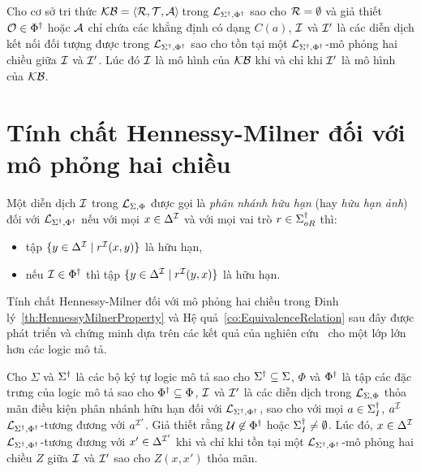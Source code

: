 \begin{Corollary}
\label{co:KnowledgeBaseInvariant}
	Cho cơ sở tri thức $\mathcal{KB} = \left\langle\mathcal{R}, \mathcal{T}, \mathcal{A}\right\rangle\!$ trong $\mathcal{L}_{\Sigma^\dag,\Phi^\dag}$ sao cho $\mathcal{R} = \emptyset$ và giả thiết $\mathcal{O} \in \Phi^\dag$ hoặc $\mathcal{A}$ chỉ chứa các khẳng định có dạng $C(a)$, $\mathcal{I}$ và $\mathcal{I}'$ là các diễn dịch kết nối đối tượng được trong $\mathcal{L}_{\Sigma^\dag,\Phi^\dag}$ sao cho tồn tại một $\mathcal{L}_{\Sigma^\dag,\Phi^\dag}$-mô phỏng hai chiều giữa $\mathcal{I}$ và $\mathcal{I}'$. Lúc đó $\mathcal{I}$ là mô hình của $\mathcal{KB}$ khi và chỉ khi $\mathcal{I}'$ là mô hình của $\mathcal{KB}$.\myend
\end{Corollary}

\section{Tính chất Hennessy-Milner đối với mô phỏng hai chiều}

\begin{Definition}
\label{def:FiniteImage}
	Một diễn dịch $\mathcal{I}$ trong $\mathcal{L}_{\Sigma,\Phi}$ được gọi là {\em phân nhánh hữu hạn} (hay {\em hữu hạn ảnh}) đối với $\mathcal{L}_{\Sigma^\dag,\Phi^\dag}$ nếu với mọi $x \in \Delta^{\mathcal{I}}$ và với mọi vai trò $r \in \Sigma^\dag_{oR}$ thì:
	\begin{itemize}
		\item tập $\{y \in \Delta^{\mathcal{I}} \mid r^{\mathcal{I}}(x,y)\}$ là hữu hạn,
		
		\item nếu $\mathcal{I} \in \Phi^\dag$ thì tập $\{y \in \Delta^{\mathcal{I}} \mid r^{\mathcal{I}}(y, x)\}$ là hữu hạn.\myend
	\end{itemize}
\end{Definition}

Tính chất Hennessy-Milner đối với mô phỏng hai chiều trong Đinh lý~\ref{th:HennessyMilnerProperty} và Hệ quả~\ref{co:EquivalenceRelation} sau đây được phát triển và chứng minh dựa trên các kết quả của nghiên cứu~\cite{Divroodi2011B} cho một lớp lớn hơn các logic mô tả.

\begin{Theorem}
\label{th:HennessyMilnerProperty}
	Cho $\Sigma$ và $\Sigma^\dag$ là các bộ ký tự logic mô tả sao cho $\Sigma^\dag \subseteq \Sigma$, $\Phi$ và $\Phi^\dag$ là tập các đặc trưng của logic mô tả sao cho $\Phi^\dag \subseteq \Phi$, $\mathcal{I}$ và $\mathcal{I}'$ là các diễn dịch trong $\mathcal{L}_{\Sigma,\Phi}$ thỏa mãn điều kiện phân nhánh hữu hạn đối với $\mathcal{L}_{\Sigma^\dag,\Phi^\dag}$, sao cho với mọi $a \in \Sigma^\dag_I$, $a^{\mathcal{I}}$ $\mathcal{L}_{\Sigma^\dag,\Phi^\dag}$-tương đương với $a^{\mathcal{I}'}$. Giả thiết rằng $\mathcal{U} \not \in \Phi^\dag$ hoặc $\Sigma^\dag_I \not= \emptyset$. Lúc đó, $x \in \Delta^{\mathcal{I}}$ $\mathcal{L}_{\Sigma^\dag,\Phi^\dag}$-tương đương với $x' \in \Delta^{\mathcal{I}'}$ khi và chỉ khi tồn tại một $\mathcal{L}_{\Sigma^\dag,\Phi^\dag}$-mô phỏng hai chiều $Z$ giữa $\mathcal{I}$ và $\mathcal{I}'$ sao cho $Z(x, x')$ thỏa mãn.\myend
\end{Theorem}

